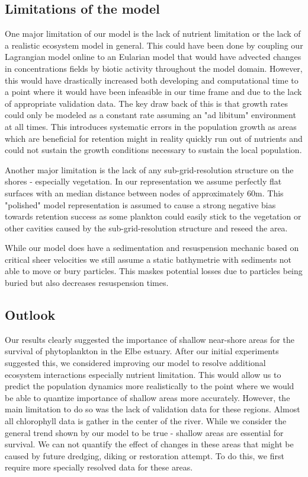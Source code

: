 \subsection*{Limitations of the model}

One major limitation of our model is the lack of nutrient limitation or the lack of a realistic ecosystem model in general.
This could have been done by coupling our Lagrangian model online to an Eularian model that would have advected changes in concentrations fields by biotic activity throughout the model domain.
However, this would have drastically increased both developing and computational time to a point where it would have been infeasible in our time frame and due to the lack of appropriate validation data.
The key draw back of this is that growth rates could only be modeled as a constant rate assuming an "ad libitum" environment at all times.
This introduces systematic errors in the population growth as areas which are beneficial for retention might in reality quickly run out of nutrients and could not sustain the growth conditions necessary to sustain the local population.

Another major limitation is the lack of any sub-grid-resolution structure on the shores - especially vegetation.
In our representation we assume perfectly flat surfaces with an median distance between nodes of approximately 60m.
This "polished" model representation is assumed to cause a strong negative bias towards retention success as some plankton could easily stick to the vegetation or other cavities caused by the sub-grid-resolution structure and reseed the area.

While our model does have a sedimentation and resuspension mechanic based on critical sheer velocities we still assume a static bathymetrie with sediments not able to move or bury particles. 
This maskes potential losses due to particles being buried but also decreases resuspension times.

\subsection*{Outlook}

Our results clearly suggested the importance of shallow near-shore areas for the survival of phytoplankton in the Elbe estuary.
After our initial experiments suggested this, we considered improving our model to resolve additional ecosystem interactions especially nutrient limitation.
This would allow us to predict the population dynamics more realistically to the point where we would be able to quantize importance of shallow areas more accurately.
However, the main limitation to do so was the lack of validation data for these regions. 
Almost all chlorophyll data is gather in the center of the river.
While we consider the general trend shown by our model to be true - shallow areas are essential for survival. We can not quantify the effect of changes in these areas that might be caused by future dredging, diking or restoration attempt.
To do this, we first require more specially resolved data for these areas.

